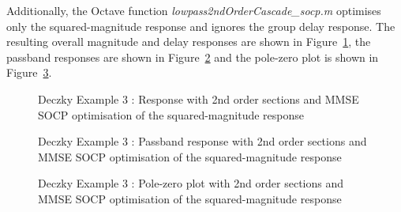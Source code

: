 \documentclass[a4paper,twoside,10pt,english]{report}
\begin{document}
Additionally, the Octave function \emph{lowpass2ndOrderCascade\_socp.m} 
optimises only the squared-magnitude response and ignores the group delay 
response. The resulting overall magnitude and delay responses are shown in 
Figure~\ref{fig:Deczky-Example-3-2ndOrder-MMSE-SOCP-x1sqm}, the passband 
responses are shown in 
Figure~\ref{fig:Deczky-Example-3-2ndOrder-MMSE-SOCP-x1sqmpass} and the pole-zero 
plot is shown in Figure~\ref{fig:Deczky-Example-3-2ndOrder-MMSE-SOCP-x1sqm-pz}.
\begin{figure}[!htbp]
\begin{center}
\scalebox{0.7}{}
\caption{Deczky Example 3 : Response with 2nd order sections and MMSE SOCP optimisation of the squared-magnitude response}
\label{fig:Deczky-Example-3-2ndOrder-MMSE-SOCP-x1sqm}
\end{center}
\end{figure}
\begin{figure}[!htbp]
\begin{center}
\scalebox{0.7}{}
\caption{Deczky Example 3 : Passband response with 2nd order sections and MMSE SOCP optimisation of the squared-magnitude response}
\label{fig:Deczky-Example-3-2ndOrder-MMSE-SOCP-x1sqmpass}
\end{center}
\end{figure}
\begin{figure}[!htbp]
\begin{center}
\scalebox{0.7}{}
\caption{Deczky Example 3 : Pole-zero plot with 2nd order sections and MMSE SOCP optimisation of the squared-magnitude response}
\label{fig:Deczky-Example-3-2ndOrder-MMSE-SOCP-x1sqm-pz}
\end{center}
\end{figure}
\clearpage
\end{document}
